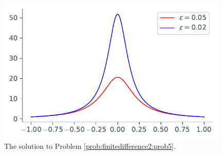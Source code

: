 \begin{figure}
\centering
\includegraphics[width=11cm]{figures/figure5.pdf}
\caption{The solution to Problem \ref{prob:finitedifference2:prob5}.
}
\end{figure}
